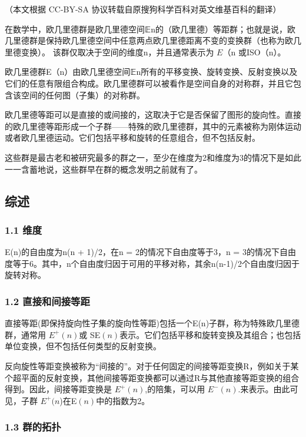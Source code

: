 
（本文根据 CC-BY-SA 协议转载自原搜狗科学百科对英文维基百科的翻译）

在数学中，欧几里德群是欧几里德空间𝔼n的（欧几里德）等距群；也就是说，欧几里德群是保持欧几里德空间中任意两点欧几里德距离不变的变换群（也称为欧几里德变换）。 该群仅取决于空间的维度n，并且通常表示为 $E$（n 或ISO（n）。

欧几里德群E（n）由欧几里德空间𝔼n所有的平移变换、旋转变换、反射变换以及它们的任意有限组合构成。欧几里德群可以被看作是空间自身的对称群，并且它包含该空间的任何图（子集）的对称群。

欧几里德等距可以是直接的或间接的，这取决于它是否保留了图形的旋向性。直接的欧几里德等距形成一个子群——特殊的欧几里德群，其中的元素被称为刚体运动或者欧几里德运动。它们包括平移和旋转的任意组合，但不包括反射。

这些群是最古老和被研究最多的群之一，至少在维度为2和维度为3的情况下是如此一一含蓄地说，这些群早在群的概念发明之前就有了。

\subsection{综述}

\subsubsection{1.1 维度}

E(n)的自由度为n(n + 1)/2，在n = 2的情况下自由度等于3，n = 3的情况下自由度等于6。其中，n个自由度归因于可用的平移对称，其余n(n-1)/2个自由度归因于旋转对称。

\subsubsection{1.2 直接和间接等距}

直接等距(即保持旋向性子集的旋向性等距)包括一个E(n)子群，称为特殊欧几里德群，通常用 $E^+(n)$或 SE$(n)$表示。它们包括平移和旋转变换及其组合；也包括单位变换，但不包括任何类型的反射变换。

反向旋性等距变换被称为“间接的”。对于任何固定的间接等距变换R，例如关于某个超平面的反射变换，其他间接等距变换都可以通过R与其他直接等距变换的组合得到。因此，间接等距变换是 $E^+(n)$,的陪集，可以用 $E^-(n)$.来表示。由此可见，子群 $E^+(n$)在E$(n)$中的指数为2。

\subsubsection{1.3 群的拓扑}



